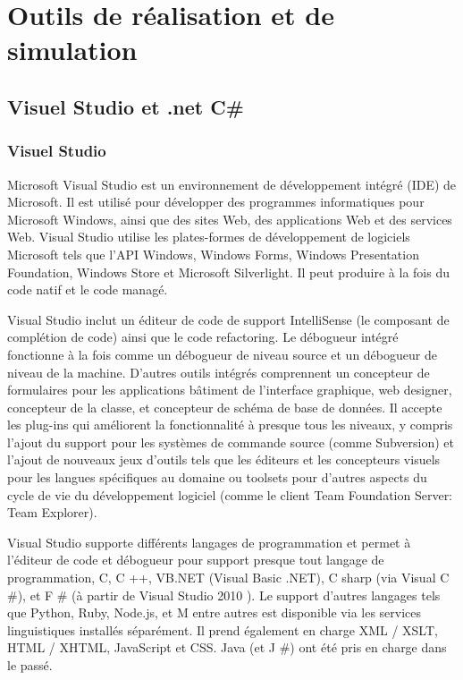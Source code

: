 \documentclass[11pt, a4paper, twoside]{book}
\begin{document}
\section{Outils	de	réalisation	et de	simulation}
\subsection{Visuel Studio et .net C\#}
\subsubsection{Visuel Studio}
Microsoft Visual Studio est un environnement de développement intégré (IDE) de Microsoft. Il est utilisé pour développer des programmes informatiques pour Microsoft Windows, ainsi que des sites Web, des applications Web et des services Web. Visual Studio utilise les plates-formes de développement de logiciels Microsoft tels que l'API Windows, Windows Forms, Windows Presentation Foundation, Windows Store et Microsoft Silverlight. Il peut produire à la fois du code natif et le code managé.

Visual Studio inclut un éditeur de code de support IntelliSense (le composant de complétion de code) ainsi que le code refactoring. Le débogueur intégré fonctionne à la fois comme un débogueur de niveau source et un débogueur de niveau de la machine. D'autres outils intégrés comprennent un concepteur de formulaires pour les applications bâtiment de l'interface graphique, web designer, concepteur de la classe, et concepteur de schéma de base de données. Il accepte les plug-ins qui améliorent la fonctionnalité à presque tous les niveaux, y compris l'ajout du support pour les systèmes de commande source (comme Subversion) et l'ajout de nouveaux jeux d'outils tels que les éditeurs et les concepteurs visuels pour les langues spécifiques au domaine ou toolsets pour d'autres aspects du cycle de vie du développement logiciel (comme le client Team Foundation Server: Team Explorer).

Visual Studio supporte différents langages de programmation et permet à l'éditeur de code et débogueur pour support  presque tout langage de programmation, C, C ++, VB.NET (Visual Basic .NET), C sharp (via Visual C \#), et F \# (à partir de Visual Studio 2010  ). Le support d'autres langages tels que Python, Ruby, Node.js, et M entre autres est disponible via les services linguistiques installés séparément. Il prend également en charge XML / XSLT, HTML / XHTML, JavaScript et CSS. Java (et J \#) ont été pris en charge dans le passé.
\end{document}
